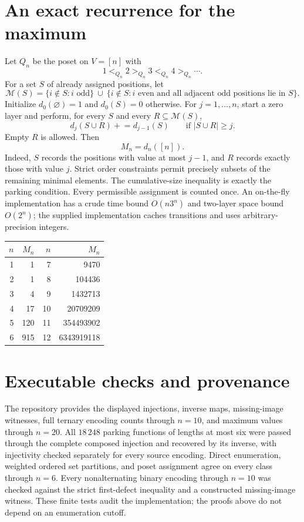 \documentclass[11pt]{article}
\theoremstyle{definition}
\begin{document}
\section{An exact recurrence for the maximum}\label{sec:recurrence}
Let $Q_n$ be the poset on $V=[n]$ with
\[
1<_{Q_n}2>_{Q_n}3<_{Q_n}4>_{Q_n}\cdots .
\]
For a set $S$ of already assigned positions, let
\[
\mathcal M(S)=
\{i\notin S:i\text{ odd}\}
\ \cup\
\{i\notin S:i\text{ even and all adjacent odd positions lie in }S\}.
\]
Initialize $d_0(\varnothing)=1$ and $d_0(S)=0$ otherwise.
For $j=1,\ldots,n$, start a zero layer and perform, for every $S$
and every $R\subseteq\mathcal M(S)$,
\[
d_j(S\cup R)\mathrel{+}=d_{j-1}(S)
\qquad\text{if } |S\cup R|\ge j.
\]
Empty $R$ is allowed. Then
\[
\boxed{M_n=d_n([n]).}
\]
Indeed, $S$ records the positions with value at most $j-1$,
and $R$ records exactly those with value $j$. Strict order
constraints permit precisely subsets of the remaining minimal
elements. The cumulative-size inequality is exactly the parking
condition. Every permissible assignment is counted once.
An on-the-fly implementation has a crude time bound $O(n3^n)$
and two-layer space bound $O(2^n)$; the supplied implementation
caches transitions and uses arbitrary-precision integers.

\begin{center}
\begin{tabular}{r r@{\qquad}r r}
\toprule
$n$&$M_n$&$n$&$M_n$\\
\midrule
1&1&7&9470\\
2&1&8&104436\\
3&4&9&1432713\\
4&17&10&20709209\\
5&120&11&354493902\\
6&915&12&6343919118\\
\bottomrule
\end{tabular}
\end{center}

\section{Executable checks and provenance}
The repository provides the displayed injections, inverse maps,
missing-image witnesses, full ternary encoding counts through $n=10$,
and maximum values through $n=20$.
All $18\,248$ parking functions of lengths at most six were passed
through the complete composed injection and recovered by its inverse,
with injectivity checked separately for every source encoding.
Direct enumeration, weighted ordered set partitions, and poset
assignment agree on every class through $n=6$.
Every nonalternating binary encoding through $n=10$ was checked
against the strict first-defect inequality and a constructed
missing-image witness. These finite tests audit the implementation;
the proofs above do not depend on an enumeration cutoff.
\end{document}
